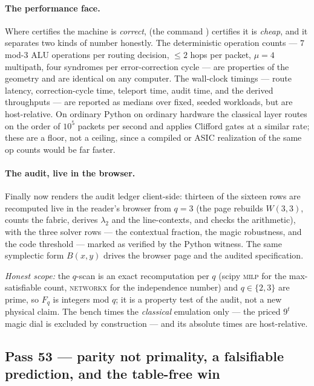 \documentclass[11pt]{article}
\begin{document}
\paragraph{The performance face.}  Where  certifies the
machine is \emph{correct},  (the command
) certifies it is \emph{cheap}, and it separates two kinds of
number honestly.  The deterministic operation counts --- \(7\) mod-\(3\) ALU
operations per routing decision, \(\le 2\) hops per packet, \(\mu=4\) multipath,
four syndromes per error-correction cycle --- are properties of the geometry and
are identical on any computer.  The wall-clock timings --- route latency,
correction-cycle time, teleport time, audit time, and the derived throughputs ---
are reported as medians over fixed, seeded workloads, but are host-relative.  On
ordinary Python on ordinary hardware the classical layer routes on the order of
\(10^5\) packets per second and applies Clifford gates at a similar rate; these
are a floor, not a ceiling, since a compiled or ASIC realization of the same op
counts would be far faster.

\paragraph{The audit, live in the browser.}  Finally 
now renders the audit ledger client-side: thirteen of the sixteen rows are
recomputed live in the reader's browser from \(q=3\) (the page rebuilds
\(W(3,3)\), counts the fabric, derives \(\lambda_2\) and the line-contexts, and
checks the arithmetic), with the three solver rows --- the contextual fraction,
the magic robustness, and the code threshold --- marked as verified by the
Python witness.  The same symplectic form \(B(x,y)\) drives the browser page and
the audited specification.

\emph{Honest scope:} the \(q\)-scan is an exact recomputation per \(q\) (scipy
\textsc{milp} for the max-satisfiable count, \textsc{networkx} for the
independence number) and \(q\in\{2,3\}\) are prime, so \(F_q\) is integers
mod \(q\); it is a property test of the audit, not a new physical claim.  The
bench times the \emph{classical} emulation only --- the priced \(9^t\) magic
dial is excluded by construction --- and its absolute times are host-relative.

\subsection{Pass 53 --- parity not primality, a falsifiable prediction, and the table-free win}
\label{sec:capstone-fiftythree}
\end{document}
